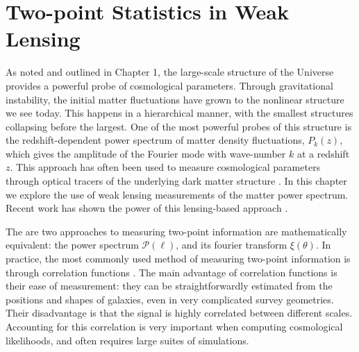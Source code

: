 \section{Two-point Statistics in Weak Lensing}
\label{sec:lensing_intro}
As noted and outlined in Chapter 1, the large-scale structure
of the Universe provides a powerful probe of
cosmological parameters.  Through gravitational instability, the initial
matter fluctuations have grown to the nonlinear structure we see today.
This happens in a hierarchical manner, with the smallest structures
collapsing before the largest.  One of the most powerful probes of this
structure is the redshift-dependent power spectrum of matter density
fluctuations, $P_k(z)$, which gives the amplitude of the
Fourier mode with wave-number $k$ at a redshift $z$. 
This approach has often been used to measure cosmological parameters
through optical tracers of the underlying dark matter structure
\citep[e.g.][]{Tegmark06}.  In this chapter we explore the use of
weak lensing measurements of the matter power spectrum.
Recent work has shown the power of this lensing-based
approach \citep{Ichiki09, Schrabback10}.

The are two approaches to measuring two-point information are 
mathematically equivalent: the power spectrum $\mathcal{P}(\ell)$,
and its fourier transform $\xi(\theta)$.  In practice,
the most commonly used method of measuring two-point information
is through correlation functions \citep[see][]{Schneider02}.
The main advantage of correlation functions is their ease of measurement:
they can be straightforwardly estimated from the positions and shapes of
galaxies, even in very complicated survey geometries.
Their disadvantage is that the
signal is highly correlated between different scales.  Accounting for this 
correlation is very important when computing cosmological likelihoods,
and often requires large suites of simulations.

